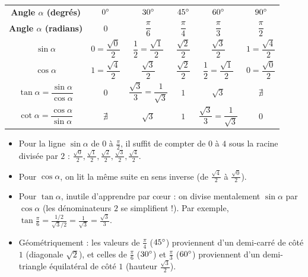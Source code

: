 \begin{theoreme}
\begin{center}
\renewcommand{\arraystretch}{1.6}
\begin{tabular}{@{}cccccc@{}}
\toprule
\textbf{Angle $\alpha$ (degrés)} & $0\degree$ & $30\degree$ & $45\degree$ & $60\degree$ & $90\degree$ \\
\textbf{Angle $\alpha$ (radians)} & $0$ & $\dfrac{\pi}{6}$ & $\dfrac{\pi}{4}$ & $\dfrac{\pi}{3}$ & $\dfrac{\pi}{2}$ \\
\midrule
$\sin\alpha$ & $0 = \dfrac{\sqrt{0}}{2}$ & $\dfrac{1}{2} = \dfrac{\sqrt{1}}{2}$ & $\dfrac{\sqrt{2}}{2}$ & $\dfrac{\sqrt{3}}{2}$ & $1 = \dfrac{\sqrt{4}}{2}$ \\
$\cos\alpha$ & $1 = \dfrac{\sqrt{4}}{2}$ & $\dfrac{\sqrt{3}}{2}$ & $\dfrac{\sqrt{2}}{2}$ & $\dfrac{1}{2} = \dfrac{\sqrt{1}}{2}$ & $0 = \dfrac{\sqrt{0}}{2}$ \\
$\tan\alpha = \dfrac{\sin\alpha}{\cos\alpha}$ & $0$ & $\dfrac{\sqrt{3}}{3} = \dfrac{1}{\sqrt{3}}$ & $1$ & $\sqrt{3}$ & $\nexists$ \\
$\cot\alpha = \dfrac{\cos\alpha}{\sin\alpha}$ & $\nexists$ & $\sqrt{3}$ & $1$ & $\dfrac{\sqrt{3}}{3} = \dfrac{1}{\sqrt{3}}$ & $0$ \\
\bottomrule
\end{tabular}
\end{center}
\end{theoreme}

\begin{astuce}
\begin{itemize}
    \item Pour la ligne $\sin\alpha$ de $0$ à $\frac{\pi}{2}$, il suffit de compter de $0$ à $4$ sous la racine divisée par $2$ : $\frac{\sqrt{0}}{2}, \frac{\sqrt{1}}{2}, \frac{\sqrt{2}}{2}, \frac{\sqrt{3}}{2}, \frac{\sqrt{4}}{2}$.
    \item Pour $\cos\alpha$, on lit la même suite en sens inverse (de $\frac{\sqrt{4}}{2}$ à $\frac{\sqrt{0}}{2}$).
    \item Pour $\tan\alpha$, inutile d'apprendre par cœur : on divise mentalement $\sin\alpha$ par $\cos\alpha$ (les dénominateurs $2$ se simplifient !). Par exemple, $\tan\frac{\pi}{6} = \frac{1/2}{\sqrt{3}/2} = \frac{1}{\sqrt{3}} = \frac{\sqrt{3}}{3}$.
    \item Géométriquement : les valeurs de $\frac{\pi}{4}$ ($45\degree$) proviennent d'un demi-carré de côté $1$ (diagonale $\sqrt{2}$), et celles de $\frac{\pi}{6}$ ($30\degree$) et $\frac{\pi}{3}$ ($60\degree$) proviennent d'un demi-triangle équilatéral de côté $1$ (hauteur $\frac{\sqrt{3}}{2}$).
\end{itemize}
\end{astuce}

